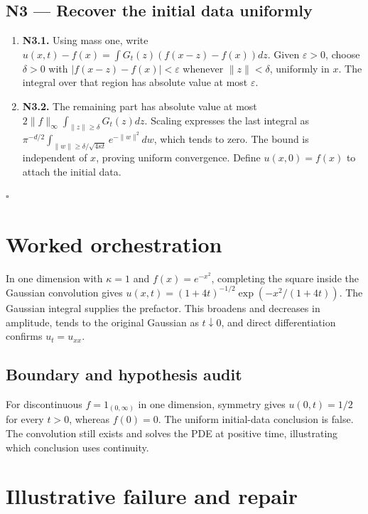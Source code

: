 \documentclass[preprint,12pt,aps,pra,showkeys,amsmath,amssymb,superscriptaddress,floatfix]{revtex4-2}
\theoremstyle{definition}
\theoremstyle{remark}
\begin{document}
\subsection{N3 --- Recover the initial data
uniformly}\label{n3-recover-the-initial-data-uniformly}

\begin{enumerate}
\def\labelenumi{\arabic{enumi}.}
\item
  \textbf{N3.1.} Using mass one, write
  \(u(x,t)-f(x)=\int G_t(z)(f(x-z)-f(x))dz\). Given \(\varepsilon>0\),
  choose \(\delta>0\) with \(|f(x-z)-f(x)|<\varepsilon\) whenever
  \(\|z\|<\delta\), uniformly in \(x\). The integral over that region
  has absolute value at most \(\varepsilon\).
\item
  \textbf{N3.2.} The remaining part has absolute value at most
  \(2\|f\|_\infty\int_{\|z\|\ge\delta}G_t(z)dz\). Scaling expresses the
  last integral as
  \(\pi^{-d/2}\int_{\|w\|\ge\delta/\sqrt{4\kappa t}}e^{-\|w\|^2}dw\),
  which tends to zero. The bound is independent of \(x\), proving
  uniform convergence. Define \(u(x,0)=f(x)\) to attach the initial
  data.
\end{enumerate}

\hfill$\square$

\section{Worked orchestration}

In one dimension with \(\kappa=1\) and \(f(x)=e^{-x^2}\), completing the
square inside the Gaussian convolution gives
\(u(x,t)=(1+4t)^{-1/2}\exp(-x^2/(1+4t))\). The Gaussian integral
supplies the prefactor. This broadens and decreases in amplitude, tends
to the original Gaussian as \(t\downarrow0\), and direct differentiation
confirms \(u_t=u_{xx}\).

\subsection{Boundary and hypothesis audit}

For discontinuous \(f=1_{(0,\infty)}\) in one dimension, symmetry gives
\(u(0,t)=1/2\) for every \(t>0\), whereas \(f(0)=0\). The uniform
initial-data conclusion is false. The convolution still exists and
solves the PDE at positive time, illustrating which conclusion uses
continuity.

\section{Illustrative failure and repair}
\end{document}
